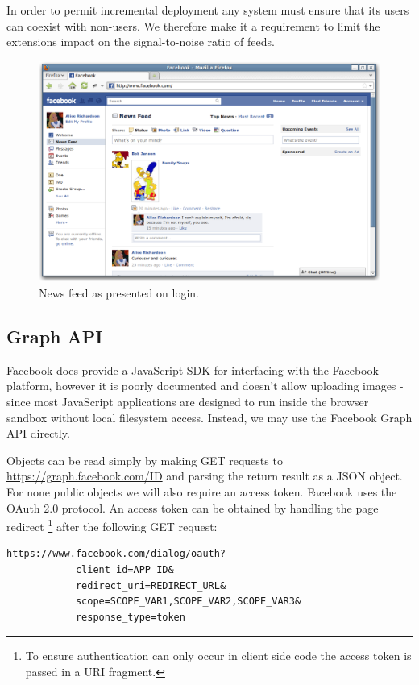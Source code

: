 In order to permit incremental deployment any system must ensure that its users can coexist with non-users. We therefore make it a requirement to limit the extensions impact on the signal-to-noise ratio of feeds.

    \begin{figure}[tb]
        \begin{center}
                \includegraphics[width=12cm]{screens/facebook.png}
            \caption{News feed as presented on login.}
            \label{scn:fbook}
        \end{center}
    \end{figure}

\FloatBarrier
\subsection{Graph API}

Facebook does provide a JavaScript SDK for interfacing with the Facebook platform, however it is poorly documented and doesn't allow uploading images - since most JavaScript applications are designed to run inside the browser sandbox without local filesystem access. Instead, we may use the Facebook Graph API directly.

Objects can be read simply by making GET requests to \url{https://graph.facebook.com/ID} and parsing the return result as a JSON object. For none public objects we will also require an access token. Facebook uses the OAuth 2.0 protocol. An access token can be obtained by handling the page redirect \footnote{To ensure authentication can only occur in client side code the access token is passed in a URI fragment.} after the following GET request:

\FloatBarrier
    \begin{lstlisting}[label=code:auth,caption=Authentication GET request,float=h]
        https://www.facebook.com/dialog/oauth?
            client_id=APP_ID&
            redirect_uri=REDIRECT_URL&
            scope=SCOPE_VAR1,SCOPE_VAR2,SCOPE_VAR3&
            response_type=token
    \end{lstlisting}
\FloatBarrier

